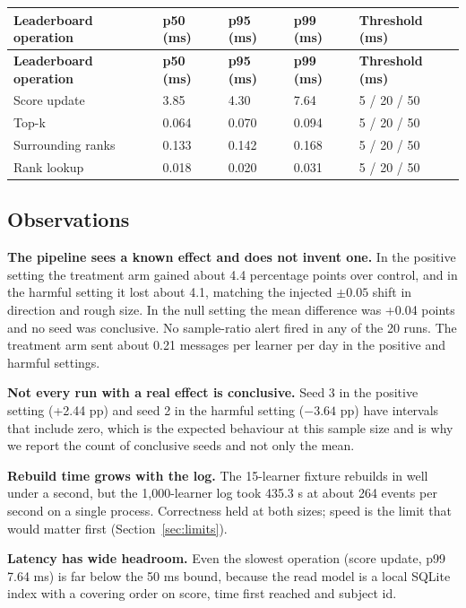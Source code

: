 \documentclass[11pt,a4paper]{article}
\newcommand{\hdr}[1]{\textbf{\color{white}\sffamily\small #1}}
\renewcommand{\_}{\textunderscore\allowbreak{}}
\begin{document}
{\small
\begin{xltabular}{\textwidth}{@{}L{3.4cm} L{2.4cm} L{2.4cm} L{2.4cm} Y@{}}
 \hdr{Leaderboard operation} & \hdr{p50 (ms)} & \hdr{p95 (ms)} & \hdr{p99 (ms)} & \hdr{Threshold (ms)} \\
\endfirsthead
{} \hdr{Leaderboard operation} & \hdr{p50 (ms)} & \hdr{p95 (ms)} & \hdr{p99 (ms)} & \hdr{Threshold (ms)} \\
\endhead
{} Score update & 3.85 & 4.30 & 7.64 & 5 / 20 / 50 \\
Top-k & 0.064 & 0.070 & 0.094 & 5 / 20 / 50 \\
 Surrounding ranks & 0.133 & 0.142 & 0.168 & 5 / 20 / 50 \\
Rank lookup & 0.018 & 0.020 & 0.031 & 5 / 20 / 50 \\
\end{xltabular}
}
\label{tab:latency}


\subsection{Observations}

\textbf{The pipeline sees a known effect and does not invent one.} In the positive setting the treatment arm gained about 4.4 percentage points over control, and in the harmful setting it lost about 4.1, matching the injected $\pm 0.05$ shift in direction and rough size. In the null setting the mean difference was +0.04 points and no seed was conclusive. No sample-ratio alert fired in any of the 20 runs. The treatment arm sent about 0.21 messages per learner per day in the positive and harmful settings.

\textbf{Not every run with a real effect is conclusive.} Seed 3 in the positive setting (+2.44 pp) and seed 2 in the harmful setting ($-3.64$ pp) have intervals that include zero, which is the expected behaviour at this sample size and is why we report the count of conclusive seeds and not only the mean.

\textbf{Rebuild time grows with the log.} The 15-learner fixture rebuilds in well under a second, but the 1,000-learner log took 435.3 s at about 264 events per second on a single process. Correctness held at both sizes; speed is the limit that would matter first (Section~\ref{sec:limits}).

\textbf{Latency has wide headroom.} Even the slowest operation (score update, p99 7.64 ms) is far below the 50 ms bound, because the read model is a local SQLite index with a covering order on score, time first reached and subject id.
\end{document}
